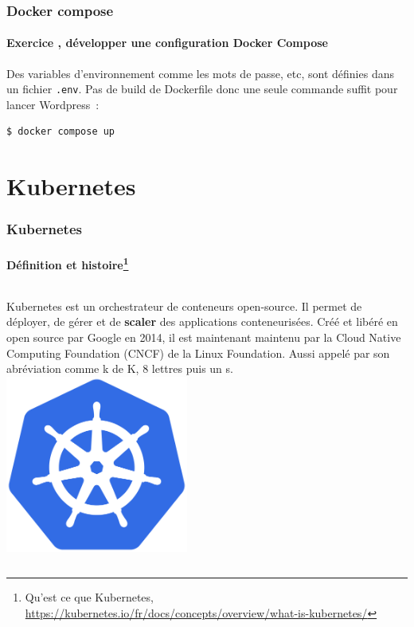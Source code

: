 \documentclass{beamer}
\begin{document}
    \begin{frame}[fragile]
        \transdissolve
        \frametitle{Docker compose}
        \framesubtitle{Exercice \execcounterdispinc{}, développer une configuration Docker Compose}
        Des variables d'environnement comme les mots de passe, etc, sont définies dans un fichier \lstinline{.env}.
        \bigbreak
        Pas de build de Dockerfile donc une seule commande suffit pour lancer Wordpress~:
        \begin{lstlisting}[language=bash]
$ docker compose up
        \end{lstlisting}
    \end{frame}


    \section{Kubernetes}\label{sec:kubernetes}

    \begin{frame}
        \transdissolve
        \frametitle{Kubernetes}
        \framesubtitle{Définition et histoire\footnote{Qu'est ce que Kubernetes, \url{https://kubernetes.io/fr/docs/concepts/overview/what-is-kubernetes/}}}
        \begin{columns}
            Kubernetes est un orchestrateur de conteneurs open-source.
            Il permet de déployer, de gérer et de \textbf{scaler} des applications conteneurisées.
            \bigbreak
            Créé et libéré en open source par Google en 2014, il est maintenant maintenu par la Cloud Native Computing Foundation (CNCF) de la Linux Foundation.
            \bigbreak
            Aussi appelé par son abréviation  comme k de K, 8 lettres puis un s.
            \centering
            \includegraphics[width=6cm]{image/kubernetes-logo}
        \end{columns}
    \end{frame}
\end{document}
